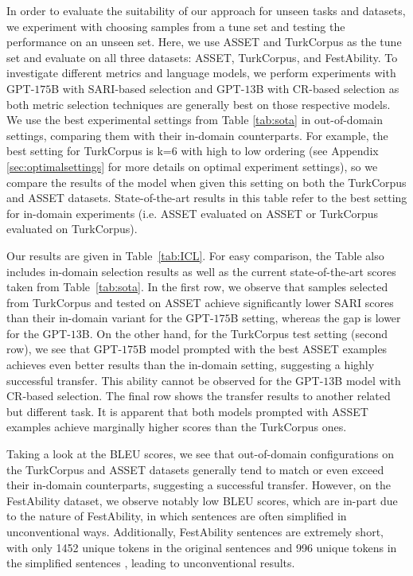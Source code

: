 \documentclass[11pt]{article}
\begin{document}
In order to evaluate the suitability of our approach for unseen tasks and datasets, we experiment with choosing samples from a tune set and testing the performance on an unseen set. Here, we use ASSET and TurkCorpus as the tune set and evaluate on all three datasets: ASSET, TurkCorpus, and FestAbility. To investigate different metrics and language models, we perform experiments with GPT-$175$B with SARI-based selection and GPT-$13$B with CR-based selection as both metric selection techniques are generally best on those respective models. We use the best experimental settings from Table \ref{tab:sota} in out-of-domain settings, comparing them with their in-domain counterparts. For example, the best setting for TurkCorpus is k=$6$ with high to low ordering (see Appendix \ref{sec:optimalsettings} for more details on optimal experiment settings), so we compare the results of the model when given this setting on both the TurkCorpus and ASSET datasets. State-of-the-art results in this table refer to the best setting for in-domain experiments (i.e. ASSET evaluated on ASSET or TurkCorpus evaluated on TurkCorpus).  

Our results are given in Table~\ref{tab:ICL}. For easy comparison, the Table also includes in-domain selection results as well as the current state-of-the-art scores taken from Table~\ref{tab:sota}. In the first row, we observe that samples selected from TurkCorpus and tested on ASSET achieve significantly lower SARI scores than their in-domain variant for the GPT-$175$B setting, whereas the gap is lower for the GPT-$13$B. On the other hand, for the TurkCorpus test setting (second row), we see that GPT-$175$B model prompted with the best ASSET examples achieves even better results than the in-domain setting, suggesting a highly successful transfer. This ability cannot be observed for the GPT-$13$B model with CR-based selection. The final row shows the transfer results to another related but different task. It is apparent that both models prompted with ASSET examples achieve marginally higher scores than the TurkCorpus ones.

Taking a look at the BLEU scores, we see that out-of-domain configurations on the TurkCorpus and ASSET datasets generally tend to match or even exceed their in-domain counterparts, suggesting a successful transfer. However, on the FestAbility dataset, we observe notably low BLEU scores, which are in-part due to the nature of FestAbility, in which sentences are often simplified in unconventional ways. Additionally, FestAbility sentences are extremely short, with only 1452 unique tokens in the original sentences and 996 unique tokens in the simplified sentences \citep{chamovitz2022cognitive}, leading to unconventional results.
\end{document}
